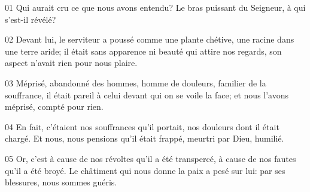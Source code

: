 01 Qui aurait cru ce que nous avons entendu? Le bras puissant du Seigneur, à qui s’est-il révélé?

02 Devant lui, le serviteur a poussé comme une plante chétive, une racine dans une terre aride; il était sans apparence ni beauté qui attire nos regards, son aspect n’avait rien pour nous plaire.

03 Méprisé, abandonné des hommes, homme de douleurs, familier de la souffrance, il était pareil à celui devant qui on se voile la face; et nous l’avons méprisé, compté pour rien.

04 En fait, c’étaient nos souffrances qu’il portait, nos douleurs dont il était chargé. Et nous, nous pensions qu’il était frappé, meurtri par Dieu, humilié.

05 Or, c’est à cause de nos révoltes qu’il a été transpercé, à cause de nos fautes qu’il a été broyé. Le châtiment qui nous donne la paix a pesé sur lui: par ses blessures, nous sommes guéris.
